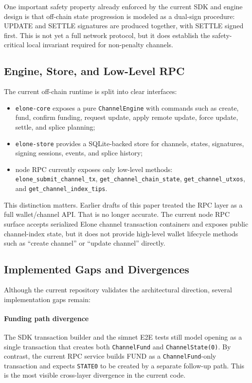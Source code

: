 One important safety property already enforced by the current SDK and engine design is that off-chain state progression is modeled as a dual-sign procedure: UPDATE and SETTLE signatures are produced together, with SETTLE signed first. This is not yet a full network protocol, but it does establish the safety-critical local invariant required for non-penalty channels.

\subsection{Engine, Store, and Low-Level RPC}

The current off-chain runtime is split into clear interfaces:
\begin{itemize}
    \item \texttt{elone-core} exposes a pure \texttt{ChannelEngine} with commands such as create, fund, confirm funding, request update, apply remote update, force update, settle, and splice planning;
    \item \texttt{elone-store} provides a SQLite-backed store for channels, states, signatures, signing sessions, events, and splice history;
    \item node RPC currently exposes only low-level methods: \texttt{elone\_submit\_channel\_tx}, \texttt{get\_channel\_chain\_state}, \texttt{get\_channel\_utxos}, and \texttt{get\_channel\_index\_tips}.
\end{itemize}

This distinction matters. Earlier drafts of this paper treated the RPC layer as a full wallet/channel API. That is no longer accurate. The current node RPC surface accepts serialized Elone channel transaction containers and exposes public channel-index state, but it does not provide high-level wallet lifecycle methods such as ``create channel'' or ``update channel'' directly.

\subsection{Implemented Gaps and Divergences}

Although the current repository validates the architectural direction, several implementation gaps remain:

\paragraph{Funding path divergence}
The SDK transaction builder and the simnet E2E tests still model opening as a single transaction that creates both \texttt{ChannelFund} and \texttt{ChannelState(0)}. By contrast, the current RPC service builds FUND as a \texttt{ChannelFund}-only transaction and expects \texttt{STATE0} to be created by a separate follow-up path. This is the most visible cross-layer divergence in the current code.

